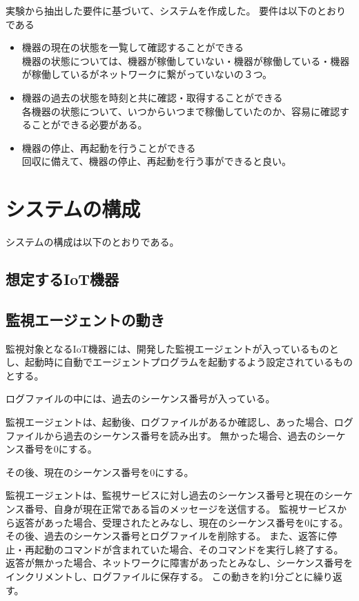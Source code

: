 実験から抽出した要件に基づいて、システムを作成した。
要件は以下のとおりである
\begin{itemize}
	\item 機器の現在の状態を一覧して確認することができる\\
		機器の状態については、機器が稼働していない・機器が稼働している・機器が稼働しているがネットワークに繋がっていないの３つ。
	\item 機器の過去の状態を時刻と共に確認・取得することができる\\
		各機器の状態について、いつからいつまで稼働していたのか、容易に確認することができる必要がある。
	\item 機器の停止、再起動を行うことができる\\
		回収に備えて、機器の停止、再起動を行う事ができると良い。
\end{itemize}

\section{システムの構成}
システムの構成は以下のとおりである。
\subsection{想定するIoT機器}

\subsection{監視エージェントの動き}
監視対象となるIoT機器には、開発した監視エージェントが入っているものとし、起動時に自動でエージェントプログラムを起動するよう設定されているものとする。


ログファイルの中には、過去のシーケンス番号が入っている。

監視エージェントは、起動後、ログファイルがあるか確認し、あった場合、ログファイルから過去のシーケンス番号を読み出す。
無かった場合、過去のシーケンス番号を0にする。

その後、現在のシーケンス番号を0にする。


監視エージェントは、監視サービスに対し過去のシーケンス番号と現在のシーケンス番号、自身が現在正常である旨のメッセージを送信する。
監視サービスから返答があった場合、受理されたとみなし、現在のシーケンス番号を0にする。
その後、過去のシーケンス番号とログファイルを削除する。
また、返答に停止・再起動のコマンドが含まれていた場合、そのコマンドを実行し終了する。
返答が無かった場合、ネットワークに障害があったとみなし、シーケンス番号をインクリメントし、ログファイルに保存する。
この動きを約1分ごとに繰り返す。

